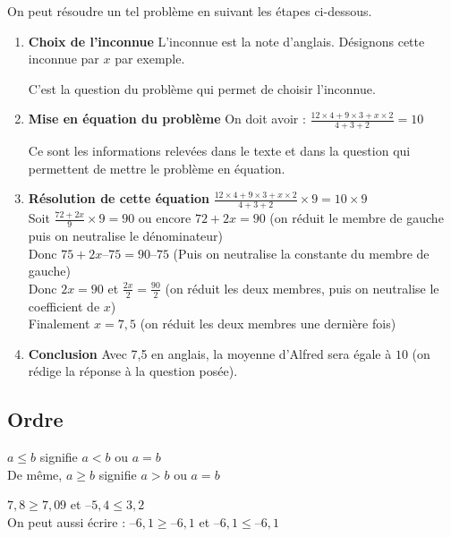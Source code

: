\documentclass[10pt]{article}
\begin{document}
{On peut résoudre un tel problème en suivant les étapes ci-dessous.
\begin{enumerate}
\item \textbf{Choix de l'inconnue}
L'inconnue est la note d'anglais. 
Désignons cette inconnue par $x$ par exemple.
\begin{Rq}
C'est la question du problème
qui permet de choisir l'inconnue.
\end{Rq}
\item \textbf{Mise en équation du problème}
On doit avoir :  $\frac{12 \times 4+9 \times 3 +x \times 2}{4+3+2}= 10$
\begin{Rq}
Ce sont les informations relevées
dans le texte et dans la question qui permettent de mettre le problème en équation.
\end{Rq} 
\item \textbf{Résolution de cette équation}
$\frac{12 \times 4+9 \times 3 +x \times 2}{4+3+2} \times 9  =10 \times 9$\\
Soit $\frac{72+2x}{9} \times 9  =90$ ou encore $72+2x=90$ (on réduit le membre de gauche puis on \og  neutralise \fg{} le dénominateur)\\
Donc $75 + 2x – 75=90 – 75$ (Puis on \og  neutralise \fg{} la constante du membre de gauche)\\
Donc $2x=90$ et $\frac{2x}{2}=\frac{90}{2}$ (on réduit les deux membres, puis on \og  neutralise \fg{} le coefficient de $x$)\\
Finalement $x=7,5$ (on réduit les deux membres
une dernière fois)
\item \textbf{Conclusion}
Avec 7,5 en anglais, 
la moyenne d'Alfred sera égale à $10$ (on rédige la réponse à la question posée).
\end{enumerate}


\subsection{Ordre}

\begin{Df}
$a \leqslant b$ signifie $a<b$ ou $a=b$\\
De même, $a \geqslant b$ signifie $a>b$ ou $a=b$
\end{Df}
 
\begin{Ex} 	
$7,8 \geqslant 7,09$ et $–5,4 \leqslant 3,2$\\
On peut aussi écrire :	$–6,1 \geqslant –6,1$		et	$–6,1 \leqslant –6,1$
\end{Ex}

}
\end{document}
